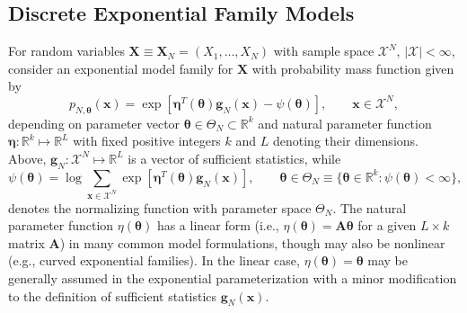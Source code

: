 \documentclass[numbib]{imamat}
\theoremstyle{theorem}
\theoremstyle{lemma}
\theoremstyle{example}
\theoremstyle{corollary}
\theoremstyle{definition}
\theoremstyle{remark}
\theoremstyle{approximation}
\theoremstyle{scheme}
\newcommand{\ak}[1]{{\color{blue} #1}}
\begin{document}
\hypertarget{discrete-exponential-family-models}{%
\subsection{Discrete Exponential Family Models}\label{discrete-exponential-family-models}}

For random variables \(\boldsymbol X \equiv\boldsymbol X_N= (X_1, \dots, X_N)\) with sample space \(\mathcal{X}^N\), \(|\mathcal{X}| < \infty\), consider an exponential \ak{model family} for \(\boldsymbol X\) with probability mass function given by
\begin{equation}
\label{eq:expo}
p_{N, \boldsymbol \theta}(\boldsymbol x) = \exp\left[\boldsymbol\eta^T(\boldsymbol \theta) \boldsymbol g_N(\boldsymbol x) - \psi(\boldsymbol \theta)\right], \qquad \boldsymbol x \in \mathcal{X}^N,
\end{equation}
depending on parameter vector \(\boldsymbol \theta \in \Theta_N \subset \mathbb{R}^{k}\) and natural parameter function \(\boldsymbol \eta : \mathbb{R}^k \mapsto \mathbb{R}^L\) with fixed positive integers \(k\) and \(L\) denoting their dimensions. Above, \(\boldsymbol g_N : \mathcal{X}^N \mapsto \mathbb{R}^L\) is a vector of sufficient statistics, while
\[
\psi(\boldsymbol \theta) = \log \sum\limits_{\boldsymbol x \in \mathcal{X}^N}\exp\left[\boldsymbol \eta^T(\boldsymbol \theta) \boldsymbol g_N(\boldsymbol x) \right], \qquad \boldsymbol \theta \in \Theta_N\equiv \{\boldsymbol \theta \in \mathbb{R}^k : \psi(\boldsymbol \theta) < \infty \},
\]
denotes the normalizing function with parameter space \(\Theta_N\). The natural parameter function \(\eta (\boldsymbol \theta)\) has a linear form (i.e., \(\eta (\boldsymbol \theta)= \bm{A} \boldsymbol \theta\) for a given \(L \times k\) matrix \(\bm{A}\)) in many common model formulations, though may also be nonlinear (e.g., curved exponential families). In the linear case, \(\eta (\boldsymbol \theta) = \boldsymbol \theta\) may be generally assumed in the exponential parameterization with a minor modification to the definition of sufficient statistics \(\boldsymbol g_N(\boldsymbol x)\).
\end{document}
